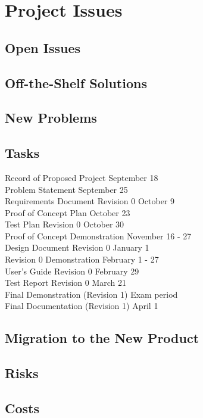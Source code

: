 \documentclass[12pt]{article}
\begin{document}
\section{Project Issues}
\subsection{Open Issues} %
\subsection{Off-the-Shelf Solutions} %
\subsection{New Problems} %
\subsection{Tasks} %

Record of Proposed Project 		\hfill 	September 18\\
Problem Statement			 	\hfill	September 25\\
Requirements Document Revision 0	\hfill	October 9\\
Proof of Concept Plan			\hfill	October 23\\
Test Plan Revision 0				\hfill	October 30\\
Proof of Concept Demonstration		\hfill	November 16 - 27\\
Design Document Revision 0		\hfill	January 1\\
Revision 0 Demonstration 			\hfill	February 1 -  27\\
User's Guide Revision 0			\hfill	February 29\\
Test Report Revision 0			\hfill	March 21\\
Final Demonstration (Revision 1)		\hfill	Exam period\\
Final Documentation (Revision 1)		\hfill	April 1


\subsection{Migration to the New Product} %
\subsection{Risks} %
\subsection{Costs} %
\end{document}
